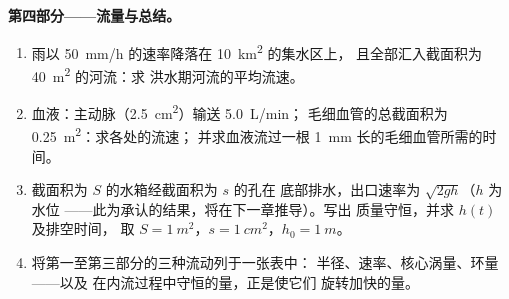 \begin{problem}
\medskip
\noindent\textbf{第四部分——流量与总结。}
\begin{enumerate}[resume]
  \item 雨以 \qty{50}{mm/h} 的速率降落在 \qty{10}{km^2} 的集水区上，
        且全部汇入截面积为 \qty{40}{m^2} 的河流：求
        洪水期河流的平均流速。
  \item 血液：主动脉（\qty{2.5}{cm^2}）输送 \qty{5.0}{L/min}；
        毛细血管的总截面积为 \qty{0.25}{m^2}：求各处的流速；
        并求血液流过一根 \qty{1}{mm} 长的毛细血管所需的时间。
  \item 截面积为 $S$ 的水箱经截面积为 $s$ 的孔在
        底部排水，出口速率为 $\sqrt{2gh}$（$h$ 为水位
——此为承认的结果，将在下一章推导）。写出
        质量守恒，并求 $h(t)$ 及排空时间，
        取 $S = \qty{1}{m^2}$，$s = \qty{1}{cm^2}$，$h_0 = \qty{1}{m}$。
  \item 将第一至第三部分的三种流动列于一张表中：
        半径、速率、核心涡量、环量——以及
        在内流过程中守恒的量，正是使它们
        旋转加快的量。
\end{enumerate}
\end{problem}
